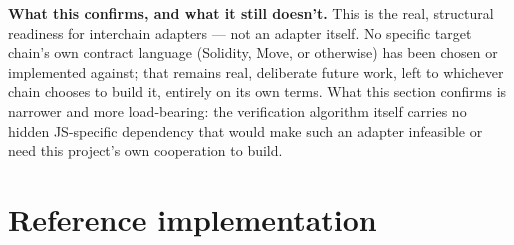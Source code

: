 \documentclass[10pt]{article}
\begin{document}
\textbf{What this confirms, and what it still doesn't.} This is the real, structural readiness for interchain adapters --- not an adapter itself. No specific target chain's own contract language (Solidity, Move, or otherwise) has been chosen or implemented against; that remains real, deliberate future work, left to whichever chain chooses to build it, entirely on its own terms. What this section confirms is narrower and more load-bearing: the verification algorithm itself carries no hidden JS-specific dependency that would make such an adapter infeasible or need this project's own cooperation to build.

\section*{Reference implementation}
\end{document}
